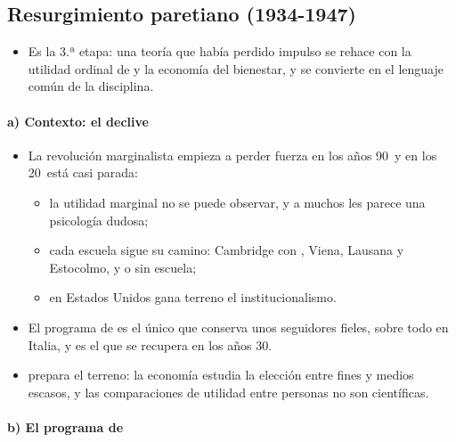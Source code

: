 \documentclass[11pt]{article}
\begin{document}
\subsection{Resurgimiento paretiano (1934-1947)}\label{sec:paretiano}

\begin{itemize}
\item Es la 3.ª etapa\nocite{Fonseca2026Neoclassicals}: una teoría que había perdido impulso se rehace con la utilidad ordinal de  y la economía del bienestar, y se convierte en el lenguaje común de la disciplina.
\end{itemize}

\paragraph{a) Contexto: el declive}

\begin{itemize}
\item La revolución marginalista empieza a perder fuerza en los años 90~y en los 20~está casi parada\nocite{Fonseca2026Phases}:
  \begin{itemize}
  \item la utilidad marginal no se puede observar, y a muchos les parece una psicología dudosa;
  \item cada escuela sigue su camino: Cambridge con , Viena, Lausana y Estocolmo, y  o  sin escuela;
  \item en Estados Unidos gana terreno el institucionalismo.
  \end{itemize}
\item El programa de  es el único que conserva unos seguidores fieles, sobre todo en Italia, y es el que se recupera en los años 30\nocite{HET2026Paretian}.
\item \textcite{Robbins1932Essay} prepara el terreno: la economía estudia la elección entre fines y medios escasos, y las comparaciones de utilidad entre personas no son científicas.
\end{itemize}

\paragraph{b) El programa de }
\end{document}

